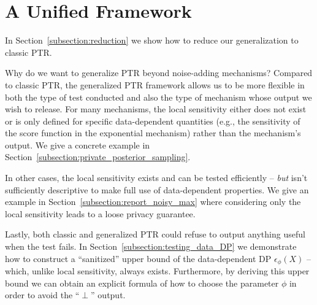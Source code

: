 \section{A Unified Framework}

 In Section~\ref{subsection:reduction} we show how to reduce our generalization to classic PTR.

Why do we want to generalize PTR beyond noise-adding mechanisms? Compared to classic PTR, the generalized PTR framework allows us to be more flexible in both the type of test conducted and also the type of mechanism whose output we wish to release. For many mechanisms, the local sensitivity either does not exist or is only defined for specific data-dependent quantities (e.g., the sensitivity of the score function in the exponential mechanism) rather than the mechanism's output. We give a concrete example in Section~\ref{subsection:private_posterior_sampling}.

In other cases, the local sensitivity exists and can be tested efficiently -- \emph{but} isn't sufficiently descriptive to make full use of data-dependent properties. We give an example in Section~\ref{subsection:report_noisy_max} where considering only the local sensitivity leads to a loose privacy guarantee.


Lastly, both classic and generalized PTR could refuse to output anything useful when the test fails. In Section~\ref{subsection:testing_data_DP} we demonstrate how to construct a ``sanitized'' upper bound of the data-dependent DP $\epsilon_\phi(X)$ -- which, unlike local sensitivity, always exists. Furthermore, by deriving this upper bound we can obtain an explicit formula of how to choose the parameter $\phi$ in order to avoid the ``$\perp$'' output.



